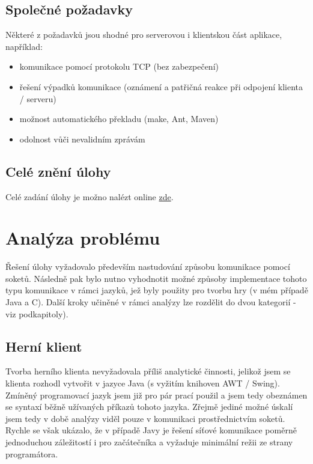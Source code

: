 \documentclass[12pt, a4paper, pdftex, czech, titlepage]{report}
\begin{document}
\section{Společné požadavky}
Některé z požadavků jsou shodné pro serverovou i klientskou část aplikace, například:

\begin{itemize}
\item komunikace pomocí protokolu TCP (bez zabezpečení)
\item řešení výpadků komunikace (oznámení a patřičná reakce při odpojení klienta / serveru)
\item možnost automatického překladu (make, Ant, Maven)
\item odolnost vůči nevalidním zprávám
\end{itemize}

\section{Celé znění úlohy}
Celé zadání úlohy je možno nalézt online \href{https://courseware.zcu.cz/portal/studium/courseware/kiv/ups/samostatna-prace.html}{zde}.
\vspace{0,5 cm}

\chapter{Analýza problému}
Řešení úlohy vyžadovalo především nastudování způsobu komunikace pomocí
soketů. Následně pak bylo nutno vyhodnotit možné způsoby implementace tohoto typu komunikace
v rámci jazyků, jež byly použity pro tvorbu hry (v mém případě Java a C). Další
kroky učiněné v rámci analýzy lze rozdělit do dvou kategorií - viz podkapitoly).

\section{Herní klient}
Tvorba herního klienta nevyžadovala příliš analytické činnosti, jelikož jsem se klienta
rozhodl vytvořit v jazyce Java (s vyžitím knihoven AWT / Swing). Zmíněný
programovací jazyk jsem již pro pár prací použil a jsem tedy obeznámen se
syntaxí běžně užívaných příkazů tohoto jazyka. Zřejmě jediné možné úskalí 
jsem tedy v době analýzy viděl pouze v komunikaci prostřednictvím soketů.
Rychle se však ukázalo, že v případě Javy je řešení síťové komunikace poměrně jednoduchou záležitostí
i pro začátečníka a vyžaduje minimální režii ze strany programátora.
\end{document}
